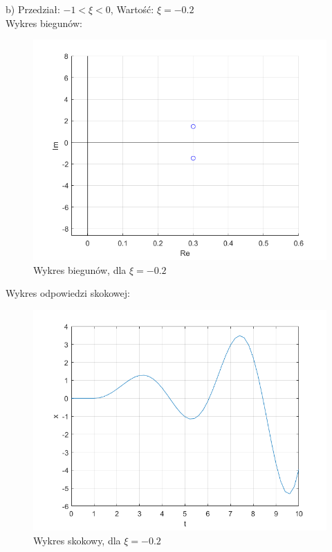 \documentclass{article}
\begin{document}
\begin{flushleft}
 
 \newpage
 b) Przedział: $-1<\xi<0$, Wartość: $\xi=-0.2$\\
  Wykres biegunów:\\
 \begin{figure}[h!]
    \centering
    \includegraphics[scale=0.6]{bieguny_ksi_-0_2.png}
    \caption{Wykres biegunów, dla $\xi=-0.2$}
    \label{fig:bieguny_ksi_-0_2}
 \end{figure}
 
 
 Wykres odpowiedzi skokowej:\\
 \begin{figure}[h!]
    \centering
    \includegraphics[scale=0.6]{ksi_-0_2.png}
    \caption{Wykres skokowy, dla $\xi=-0.2$}
    \label{fig:ksi_-0_2}
 \end{figure}
 

\end{flushleft}
\end{document}
